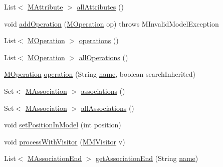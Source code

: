 \begin{DoxyCompactItemize}
List$<$ \hyperlink{classorg_1_1tzi_1_1use_1_1uml_1_1mm_1_1_m_attribute}{M\-Attribute} $>$ \hyperlink{interfaceorg_1_1tzi_1_1use_1_1uml_1_1mm_1_1_m_class_a5c6382c321a760170f80a305872d781a}{all\-Attributes} ()
\item 
void \hyperlink{interfaceorg_1_1tzi_1_1use_1_1uml_1_1mm_1_1_m_class_a418c8a2ae36f722e7e7ec956ac88da69}{add\-Operation} (\hyperlink{classorg_1_1tzi_1_1use_1_1uml_1_1mm_1_1_m_operation}{M\-Operation} op)  throws M\-Invalid\-Model\-Exception
\item 
List$<$ \hyperlink{classorg_1_1tzi_1_1use_1_1uml_1_1mm_1_1_m_operation}{M\-Operation} $>$ \hyperlink{interfaceorg_1_1tzi_1_1use_1_1uml_1_1mm_1_1_m_class_aebcdd86bfc86e9c0e6255ab594f7b6b0}{operations} ()
\item 
List$<$ \hyperlink{classorg_1_1tzi_1_1use_1_1uml_1_1mm_1_1_m_operation}{M\-Operation} $>$ \hyperlink{interfaceorg_1_1tzi_1_1use_1_1uml_1_1mm_1_1_m_class_a7ef2aa55dec05a4fa30f8cc44639a395}{all\-Operations} ()
\item 
\hyperlink{classorg_1_1tzi_1_1use_1_1uml_1_1mm_1_1_m_operation}{M\-Operation} \hyperlink{interfaceorg_1_1tzi_1_1use_1_1uml_1_1mm_1_1_m_class_a2059ef3317e90f4540964c5134089198}{operation} (String \hyperlink{interfaceorg_1_1tzi_1_1use_1_1uml_1_1mm_1_1_m_named_element_af39159f41090d3cacd3dd088f8a6cc42}{name}, boolean search\-Inherited)
\item 
Set$<$ \hyperlink{interfaceorg_1_1tzi_1_1use_1_1uml_1_1mm_1_1_m_association}{M\-Association} $>$ \hyperlink{interfaceorg_1_1tzi_1_1use_1_1uml_1_1mm_1_1_m_class_a29e979f815d3f53a9e45caaf5fe97c20}{associations} ()
\item 
Set$<$ \hyperlink{interfaceorg_1_1tzi_1_1use_1_1uml_1_1mm_1_1_m_association}{M\-Association} $>$ \hyperlink{interfaceorg_1_1tzi_1_1use_1_1uml_1_1mm_1_1_m_class_a12d8675e7080d98abbd4a14264042f49}{all\-Associations} ()
\item 
void \hyperlink{interfaceorg_1_1tzi_1_1use_1_1uml_1_1mm_1_1_m_class_ab22df6afec88b4ad776c46fbd72c599a}{set\-Position\-In\-Model} (int position)
\item 
void \hyperlink{interfaceorg_1_1tzi_1_1use_1_1uml_1_1mm_1_1_m_class_a22a74d1c307ac12b11600309c32fa3db}{process\-With\-Visitor} (\hyperlink{interfaceorg_1_1tzi_1_1use_1_1uml_1_1mm_1_1_m_m_visitor}{M\-M\-Visitor} v)
\item 
List$<$ \hyperlink{classorg_1_1tzi_1_1use_1_1uml_1_1mm_1_1_m_association_end}{M\-Association\-End} $>$ \hyperlink{interfaceorg_1_1tzi_1_1use_1_1uml_1_1mm_1_1_m_class_ae7be17fa64a36ff28d3dc04500425a88}{get\-Association\-End} (String \hyperlink{interfaceorg_1_1tzi_1_1use_1_1uml_1_1mm_1_1_m_named_element_af39159f41090d3cacd3dd088f8a6cc42}{name})

\end{DoxyCompactItemize}
